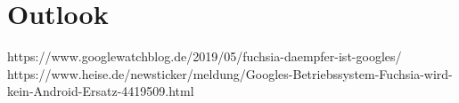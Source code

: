 
\chapter{Outlook} \label{ch:outlook}

https://www.googlewatchblog.de/2019/05/fuchsia-daempfer-ist-googles/
https://www.heise.de/newsticker/meldung/Googles-Betriebssystem-Fuchsia-wird-kein-Android-Ersatz-4419509.html

